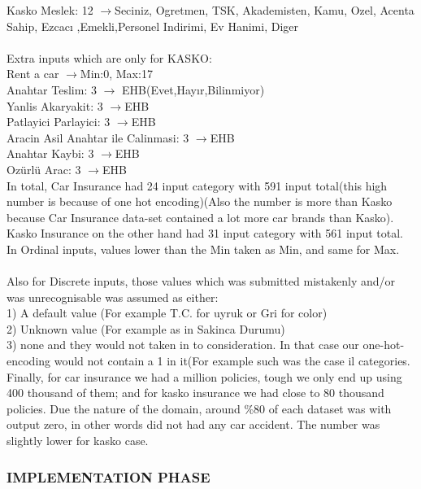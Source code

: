 \documentclass[titlepage, a4paper, 14pt]{extarticle} %
\begin{document}
Kasko Meslek: 12 $\rightarrow$Seciniz, Ogretmen, TSK, Akademisten, Kamu, Ozel, Acenta Sahip, Ezcacı ,Emekli,Personel Indirimi, Ev Hanimi, Diger\\\\
Extra inputs which are only for KASKO:\\
Rent a car $\rightarrow$Min:0, Max:17\\
Anahtar Teslim: 3 $\rightarrow$ EHB(Evet,Hayır,Bilinmiyor) \\
Yanlis Akaryakit: 3 $\rightarrow$EHB\\
Patlayici Parlayici: 3 $\rightarrow$EHB\\
Aracin Asil Anahtar ile Calinmasi: 3 $\rightarrow$EHB\\
Anahtar Kaybi: 3 $\rightarrow$EHB\\
Ozürlü Arac: 3 $\rightarrow$EHB\\

In total, Car Insurance had 24 input category with 591 input total(this high number is because of one hot encoding)(Also the number is more than Kasko because Car Insurance data-set contained a lot more car brands than Kasko).\\

Kasko Insurance on the other hand had 31 input category with 561 input total.\\

In Ordinal inputs, values lower than the Min taken as Min, and same for Max.\\\\
Also for Discrete inputs, those values which was submitted mistakenly and/or was unrecognisable was assumed as either:\\
1) A default value (For example T.C. for uyruk or Gri for color)\\
2) Unknown value (For example as in Sakinca Durumu)\\
3) none and they would not taken in to consideration. In that case our one-hot-encoding would not contain a 1 in it(For example such was the case il categories.\\

Finally, for car insurance we had a million policies, tough we only end up using 400 thousand of them; and for kasko insurance we had close to 80 thousand policies. Due the nature of the domain, around $\%80$ of each dataset was with output zero, in other words did not had any car accident. The number was slightly lower for kasko case.

\subsubsection{IMPLEMENTATION PHASE} \label{implementation}
\end{document}
